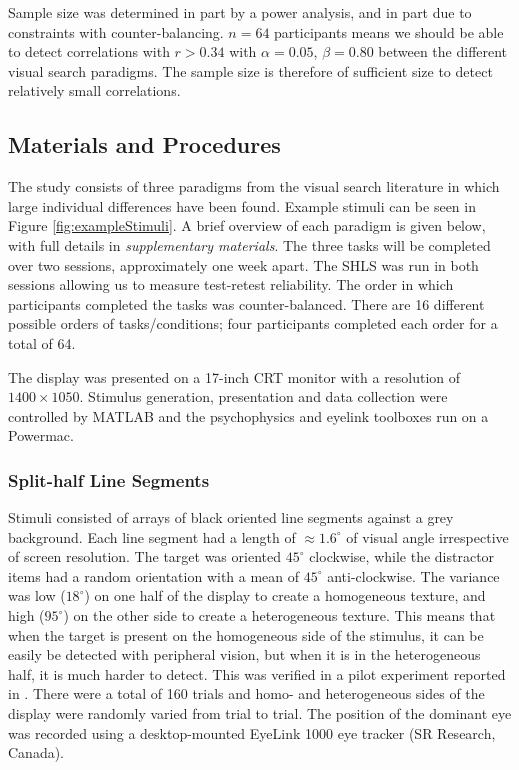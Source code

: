 \documentclass[]{rsos}%
\begin{document}
Sample size was determined in part by a power analysis, and in part due to constraints with counter-balancing. $n = 64$ participants means we should be able to detect correlations with $r > 0.34$ with $\alpha = 0.05$, $\beta = 0.80$ between the different visual search paradigms. The sample size is therefore of sufficient size to detect relatively small correlations.

\subsection{Materials and Procedures}

The study consists of three paradigms from the visual search literature in which large individual differences have been  found\cite{nowakowska2017, irons-leber2016, kristjansson2014}. Example stimuli can be seen in Figure \ref{fig:exampleStimuli}. A brief overview of each paradigm is given below, with full details in \textit{supplementary materials}. The three tasks will be completed over two sessions, approximately one week apart. The SHLS was run in both sessions allowing us to measure test-retest reliability. The order in which participants completed the tasks was counter-balanced. There are 16 different possible orders of tasks/conditions; four participants completed each order for a total of 64.

The display was presented on a 17-inch CRT monitor with a resolution of $1400 \times 1050$. Stimulus generation, presentation and data collection were controlled by MATLAB and the psychophysics and eyelink toolboxes \cite{brainard1997,cornelissen2002} run on a Powermac. 

\subsubsection{Split-half Line Segments}

Stimuli consisted of arrays of black oriented line segments against a grey background. Each line segment had a length of $\approx$$1.6^{\circ}$ of visual angle irrespective of screen resolution. The target was oriented $45^{\circ}$ clockwise, while the distractor items had a random orientation with a mean of $45^{\circ}$ anti-clockwise. The variance was low ($18^{\circ}$) on one half of the display to create a homogeneous texture, and high ($95^{\circ}$) on the other side to create a heterogeneous texture. This means that when the target is present on the homogeneous side of the stimulus, it can be easily be detected with peripheral vision, but when it is in the heterogeneous half, it is much harder to detect. This was verified in a pilot experiment reported in \cite{nowakowska2017}.  There were a total of 160 trials and homo- and heterogeneous sides of the display were randomly varied from trial to trial. The position of the dominant eye was recorded using a desktop-mounted EyeLink 1000 eye tracker (SR Research, Canada). 
\end{document}
